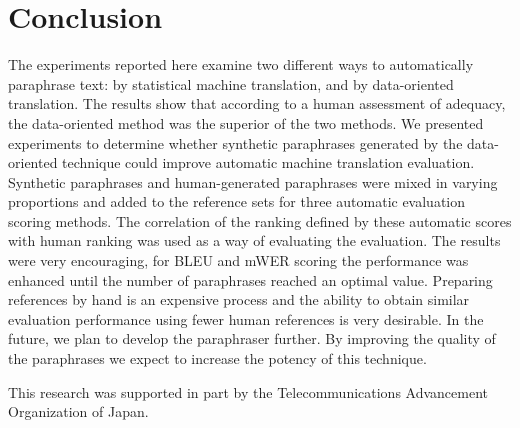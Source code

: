 \section{Conclusion}
\label{sec:application:conclusion}

The experiments reported here examine two different ways to automatically paraphrase text: by statistical
machine translation, and by data-oriented translation. The results show that according to a human assessment
of adequacy, the data-oriented method was the superior of the two methods. We presented experiments to determine
whether synthetic paraphrases generated by the data-oriented technique could improve automatic machine
translation evaluation. Synthetic paraphrases and human-generated paraphrases were mixed in varying proportions
and added to the reference sets for three automatic evaluation scoring methods. The correlation of the ranking
defined by these automatic scores with human ranking was used as a way of evaluating the evaluation. The results
were very encouraging, for BLEU and mWER scoring the performance was enhanced until the number of paraphrases
reached an optimal value. Preparing references by hand is an expensive process and the ability to obtain similar
evaluation performance using fewer human references is very desirable. In the future, we plan to develop the
paraphraser further. By improving the quality of the paraphrases we expect to increase the potency of this
technique.

\acknowledgment

This research was supported in part by the Telecommunications Advancement
Organization of Japan.


\newpage

